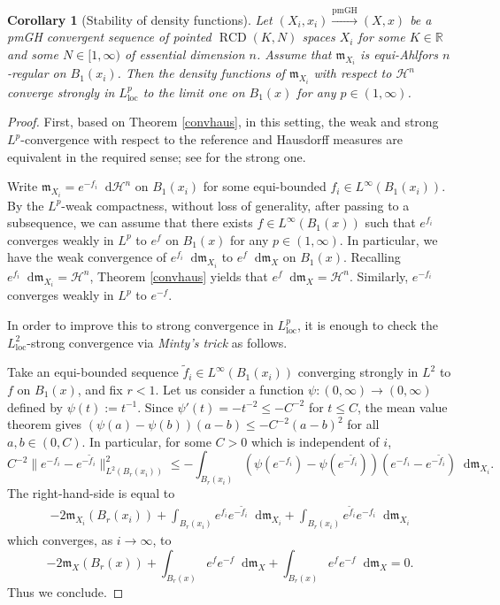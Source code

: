 \documentclass[11pt,reqno]{amsart}
\newtheorem{corollary}[theorem]{Corollary}
\theoremstyle{definition}
\numberwithin{equation}{section}
\newcommand{\di}{\mathop{}\!\mathrm{d}}
\newcommand{\meas}{\mathfrak{m}}
\DeclareMathOperator{\loc}{loc}
\DeclareMathOperator{\RCD}{RCD}
\newcommand{\haus}{\mathscr{H}}
\begin{document}
\begin{corollary}[Stability of density functions]\label{propoharmch}
Let 
$
(X_i, x_i) \stackrel{\mathrm{pmGH}}{\to} (X,x)
$
be a pmGH convergent sequence of pointed $\RCD(K, N)$ spaces $X_i$ for some $K \in \mathbb{R}$ and some $N \in [1, \infty)$ of essential dimension $n$.
Assume that $\meas_{X_i}$ is equi-Ahlfors $n$-regular on $B_1(x_i)$. 
Then the density functions of $\meas_{X_i}$ with respect to $\haus^n$ converge strongly in  $L^p_{\loc}$ to the limit one on $B_1(x)$ for any $p \in (1, \infty)$. 
\end{corollary}
\begin{proof}
First, based on Theorem \ref{convhaus},  in this setting, the weak and strong  $L^p$-convergence with respect to the reference and Hausdorff measures are equivalent in the required sense; see \cite[Definition 3.25]{Honda2} for the strong one. 

Write $\meas_{X_i}=e^{-f_i}\di \haus^n$ on $B_1(x_i)$ for some equi-bounded $f_i \in L^{\infty}(B_1(x_i))$.
By the $L^p$-weak compactness, without loss of generality, after passing to a subsequence, we can assume that there exists $f \in L^{\infty}(B_1(x))$ such that $e^{f_i}$ converges weakly in $L^p$ to $e^f$ on $B_1(x)$ for any $p \in (1, \infty)$. 
In particular, we have the weak convergence of $e^{f_i}\di \meas_{X_i}$ to $e^f\di \meas_X$ on $B_1(x)$. Recalling $e^{f_i}\di \meas_{X_i}=\haus^n$, Theorem \ref{convhaus} yields that $e^f\di \meas_X=\haus^n$. Similarly, $e^{-f_i}$ converges weakly in $L^p$ to $e^{-f}$.

In order to improve this to strong convergence in $L^p_{\loc}$, it is enough to check the $L^2_{\loc}$-strong convergence via \textit{Minty's trick} as follows.

Take an equi-bounded sequence $\tilde f_i \in L^{\infty}(B_1(x_i))$ converging strongly in  $L^2$ to $f$ on $B_1(x)$, and fix $r<1$.
Let us consider a function $\psi:(0, \infty) \to (0, \infty)$ defined by $\psi(t):=t^{-1}$. Since $\psi'(t)=-t^{-2} \le -C^{-2}$ for $t\le C$,  the mean value theorem gives $
    (\psi(a)-\psi(b))(a-b)\le -C^{-2}(a-b)^2$ for all $a, b \in (0, C)$.
In particular, for some $C>0$ which is independent of $i$,
\begin{equation}\label{minty}
    C^{-2}\|e^{-f_i}-e^{-\tilde f_i}\|_{L^2(B_r(x_i))}^2 \le -\int_{B_r(x_i)}\left(\psi(e^{-f_i})-\psi(e^{-\tilde f_i})\right)(e^{-f_i}-e^{-\tilde f_i})\di \meas_{X_i}.
\end{equation}
The right-hand-side is equal to
\begin{align}
    -2\meas_{X_i}(B_r(x_i))+\int_{B_r(x_i)}e^{f_i}e^{-\tilde f_i}\di \meas_{X_i}+\int_{B_r(x_i)}e^{\tilde f_i}e^{-f_i}\di \meas_{X_i}
\end{align}
which converges, as $i \to \infty$, to
\begin{equation}
    -2\meas_X(B_r(x))+\int_{B_r(x)}e^{f}e^{-f}\di \meas_{X}+\int_{B_r(x)}e^fe^{-f}\di \meas_X=0.
\end{equation}
Thus we conclude.
\end{proof}
\end{document}

